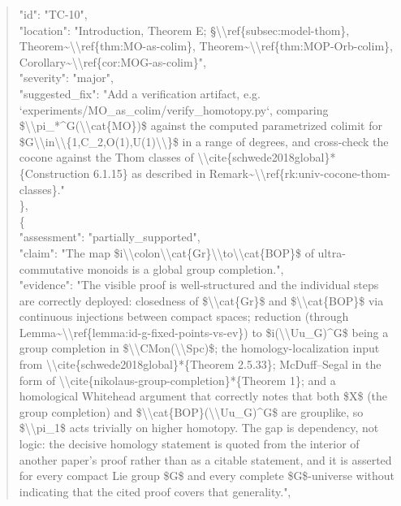\documentclass[11pt]{article}
\begin{document}
\begin{quote}
      "id": "TC-10",\\
      "location": "Introduction, Theorem E; §\textbackslash{}\textbackslash{}ref\{subsec:model-thom\}, Theorem\~{}\textbackslash{}\textbackslash{}ref\{thm:MO-as-colim\}, Theorem\~{}\textbackslash{}\textbackslash{}ref\{thm:MOP-Orb-colim\}, Corollary\~{}\textbackslash{}\textbackslash{}ref\{cor:MOG-as-colim\}",\\
      "severity": "major",\\
      "suggested\_fix": "Add a verification artifact, e.g. `experiments/MO\_as\_colim/verify\_homotopy.py`, comparing \$\textbackslash{}\textbackslash{}pi\_*\^{}G(\textbackslash{}\textbackslash{}cat\{MO\})\$ against the computed parametrized colimit for \$G\textbackslash{}\textbackslash{}in\textbackslash{}\textbackslash{}\{1,C\_2,O(1),U(1)\textbackslash{}\textbackslash{}\}\$ in a range of degrees, and cross-check the cocone against the Thom classes of \textbackslash{}\textbackslash{}cite\{schwede2018global\}*\{Construction 6.1.15\} as described in Remark\~{}\textbackslash{}\textbackslash{}ref\{rk:univ-cocone-thom-classes\}."\\
    \},\\
    \{\\
      "assessment": "partially\_supported",\\
      "claim": "The map \$i\textbackslash{}\textbackslash{}colon\textbackslash{}\textbackslash{}cat\{Gr\}\textbackslash{}\textbackslash{}to\textbackslash{}\textbackslash{}cat\{BOP\}\$ of ultra-commutative monoids is a global group completion.",\\
      "evidence": "The visible proof is well-structured and the individual steps are correctly deployed: closedness of \$\textbackslash{}\textbackslash{}cat\{Gr\}\$ and \$\textbackslash{}\textbackslash{}cat\{BOP\}\$ via continuous injections between compact spaces; reduction (through Lemma\~{}\textbackslash{}\textbackslash{}ref\{lemma:id-g-fixed-points-vs-ev\}) to \$i(\textbackslash{}\textbackslash{}Uu\_G)\^{}G\$ being a group completion in \$\textbackslash{}\textbackslash{}CMon(\textbackslash{}\textbackslash{}Spc)\$; the homology-localization input from \textbackslash{}\textbackslash{}cite\{schwede2018global\}*\{Theorem 2.5.33\}; McDuff--Segal in the form of \textbackslash{}\textbackslash{}cite\{nikolaus-group-completion\}*\{Theorem 1\}; and a homological Whitehead argument that correctly notes that both \$X\$ (the group completion) and \$\textbackslash{}\textbackslash{}cat\{BOP\}(\textbackslash{}\textbackslash{}Uu\_G)\^{}G\$ are grouplike, so \$\textbackslash{}\textbackslash{}pi\_1\$ acts trivially on higher homotopy. The gap is dependency, not logic: the decisive homology statement is quoted from the interior of another paper's proof rather than as a citable statement, and it is asserted for every compact Lie group \$G\$ and every complete \$G\$-universe without indicating that the cited proof covers that generality.",\\

\end{quote}
\end{document}
